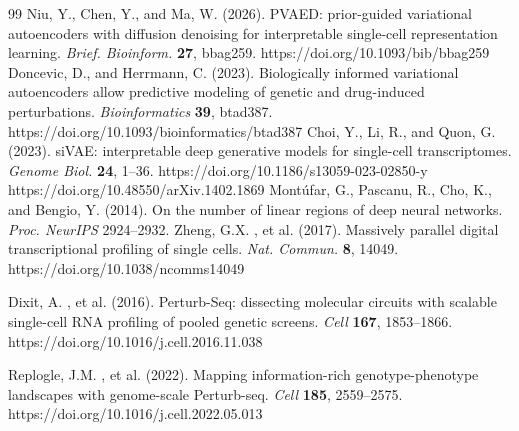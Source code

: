 \documentclass[11pt,a4paper]{article}
\begin{document}
\begin{thebibliography}{99}
 Niu, Y., Chen, Y., and Ma, W. (2026). PVAED: prior-guided variational autoencoders with diffusion denoising for interpretable single-cell representation learning. \textit{Brief. Bioinform.} \textbf{27}, bbag259. https://doi.org/10.1093/bib/bbag259
 Doncevic, D., and Herrmann, C. (2023). Biologically informed variational autoencoders allow predictive modeling of genetic and drug-induced perturbations. \textit{Bioinformatics} \textbf{39}, btad387. https://doi.org/10.1093/bioinformatics/btad387
 Choi, Y., Li, R., and Quon, G. (2023). siVAE: interpretable deep generative models for single-cell transcriptomes. \textit{Genome Biol.} \textbf{24}, 1--36. https://doi.org/10.1186/s13059-023-02850-y
 https://doi.org/10.48550/arXiv.1402.1869 Mont\'{u}far, G., Pascanu, R., Cho, K., and Bengio, Y. (2014). On the number of linear regions of deep neural networks. \textit{Proc. NeurIPS} 2924--2932.
 Zheng, G.X. , et al. (2017). Massively parallel digital transcriptional profiling of single cells. \textit{Nat. Commun.} \textbf{8}, 14049. https://doi.org/10.1038/ncomms14049

 Dixit, A. , et al. (2016). Perturb-Seq: dissecting molecular circuits with scalable single-cell RNA profiling of pooled genetic screens. \textit{Cell} \textbf{167}, 1853--1866. https://doi.org/10.1016/j.cell.2016.11.038

 Replogle, J.M. , et al. (2022). Mapping information-rich genotype-phenotype landscapes with genome-scale Perturb-seq. \textit{Cell} \textbf{185}, 2559--2575. https://doi.org/10.1016/j.cell.2022.05.013


\end{thebibliography}
\end{document}
